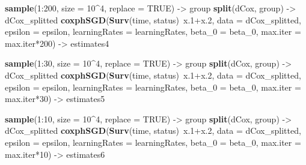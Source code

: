 \documentclass[]{article}
\newenvironment{Shaded}{\begin{snugshade}}{\end{snugshade}}
\newcommand{\KeywordTok}[1]{\textcolor[rgb]{0.13,0.29,0.53}{\textbf{{#1}}}}
\newcommand{\DataTypeTok}[1]{\textcolor[rgb]{0.13,0.29,0.53}{{#1}}}
\newcommand{\DecValTok}[1]{\textcolor[rgb]{0.00,0.00,0.81}{{#1}}}
\newcommand{\FloatTok}[1]{\textcolor[rgb]{0.00,0.00,0.81}{{#1}}}
\newcommand{\StringTok}[1]{\textcolor[rgb]{0.31,0.60,0.02}{{#1}}}
\newcommand{\OtherTok}[1]{\textcolor[rgb]{0.56,0.35,0.01}{{#1}}}
\newcommand{\NormalTok}[1]{{#1}}
\begin{document}
\begin{Shaded}
\begin{Highlighting}[]
  \KeywordTok{sample}\NormalTok{(}\DecValTok{1}\NormalTok{:}\DecValTok{200}\NormalTok{, }\DataTypeTok{size =} \DecValTok{10}\NormalTok{^}\DecValTok{4}\NormalTok{, }\DataTypeTok{replace =} \OtherTok{TRUE}\NormalTok{) ->}\StringTok{ }\NormalTok{group}
  \KeywordTok{split}\NormalTok{(dCox, group) ->}\StringTok{ }\NormalTok{dCox_splitted}
  \KeywordTok{coxphSGD}\NormalTok{(}\KeywordTok{Surv}\NormalTok{(time, status)~x}\FloatTok{.1}\NormalTok{+x}\FloatTok{.2}\NormalTok{, }\DataTypeTok{data =} \NormalTok{dCox_splitted,}
           \DataTypeTok{epsilon =} \NormalTok{epsilon, }\DataTypeTok{learningRates =} \NormalTok{learningRates,}
           \DataTypeTok{beta_0 =} \NormalTok{beta_0, }\DataTypeTok{max.iter =} \NormalTok{max.iter*}\DecValTok{200}\NormalTok{) ->}\StringTok{ }\NormalTok{estimates4}


  \KeywordTok{sample}\NormalTok{(}\DecValTok{1}\NormalTok{:}\DecValTok{30}\NormalTok{, }\DataTypeTok{size =} \DecValTok{10}\NormalTok{^}\DecValTok{4}\NormalTok{, }\DataTypeTok{replace =} \OtherTok{TRUE}\NormalTok{) ->}\StringTok{ }\NormalTok{group}
  \KeywordTok{split}\NormalTok{(dCox, group) ->}\StringTok{ }\NormalTok{dCox_splitted}
  \KeywordTok{coxphSGD}\NormalTok{(}\KeywordTok{Surv}\NormalTok{(time, status)~x}\FloatTok{.1}\NormalTok{+x}\FloatTok{.2}\NormalTok{, }\DataTypeTok{data =} \NormalTok{dCox_splitted,}
           \DataTypeTok{epsilon =} \NormalTok{epsilon, }\DataTypeTok{learningRates =} \NormalTok{learningRates,}
           \DataTypeTok{beta_0 =} \NormalTok{beta_0, }\DataTypeTok{max.iter =} \NormalTok{max.iter*}\DecValTok{30}\NormalTok{) ->}\StringTok{ }\NormalTok{estimates5}


  \KeywordTok{sample}\NormalTok{(}\DecValTok{1}\NormalTok{:}\DecValTok{10}\NormalTok{, }\DataTypeTok{size =} \DecValTok{10}\NormalTok{^}\DecValTok{4}\NormalTok{, }\DataTypeTok{replace =} \OtherTok{TRUE}\NormalTok{) ->}\StringTok{ }\NormalTok{group}
  \KeywordTok{split}\NormalTok{(dCox, group) ->}\StringTok{ }\NormalTok{dCox_splitted}
  \KeywordTok{coxphSGD}\NormalTok{(}\KeywordTok{Surv}\NormalTok{(time, status)~x}\FloatTok{.1}\NormalTok{+x}\FloatTok{.2}\NormalTok{, }\DataTypeTok{data =} \NormalTok{dCox_splitted,}
           \DataTypeTok{epsilon =} \NormalTok{epsilon, }\DataTypeTok{learningRates =} \NormalTok{learningRates,}
           \DataTypeTok{beta_0 =} \NormalTok{beta_0, }\DataTypeTok{max.iter =} \NormalTok{max.iter*}\DecValTok{10}\NormalTok{) ->}\StringTok{ }\NormalTok{estimates6}


\end{Highlighting}
\end{Shaded}
\end{document}
